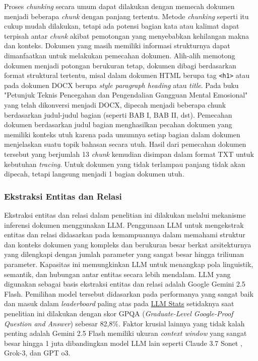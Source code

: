 Proses \textit{chunking} secara umum dapat dilakukan dengan memecah dokumen menjadi beberapa \textit{chunk} dengan panjang tertentu.
Metode \textit{chunking} seperti itu cukup mudah dilakukan, tetapi ada potensi bagian kata atau kalimat dapat terpisah antar \textit{chunk} akibat pemotongan yang menyebabkan kehilangan makna dan konteks.
Dokumen yang masih memiliki informasi strukturnya dapat dimanfaatkan untuk melakukan pemecahan dokumen.
Alih-alih memotong dokumen menjadi potongan berukuran tetap, dokumen dibagi berdasarkan format struktural tertentu, misal dalam dokumen HTML berupa tag \texttt{<h1>} atau pada dokumen DOCX berupa \textit{style paragraph heading} atau \textit{title}.
Pada buku "Petunjuk Teknis Pencegahan dan Pengendalian Gangguan Mental Emosional" yang telah dikonversi menjadi DOCX, dipecah menjadi beberapa chunk berdasarkan judul-judul bagian (seperti BAB I, BAB II, dst).
Pemecahan dokumen berdasarkan judul bagian menghasilkan pecahan dokumen yang memiliki konteks utuh karena pada umumnya setiap bagian dalam dokumen menjelaskan suatu topik bahasan secara utuh.
Hasil dari pemecahan dokumen tersebut yang berjumlah 13 \textit{chunk} kemudian disimpan dalam format TXT untuk kebutuhan \textit{tracing}.
Untuk dokumen yang tidak terlampau panjang tidak akan dipecah, tetapi langsung menjadi 1 bagian dokumen utuh.

\subsubsection{Ekstraksi Entitas dan Relasi}
Ekstraksi entitas dan relasi dalam penelitian ini dilakukan melalui mekanisme inferensi dokumen menggunakan LLM.
Penggunaan LLM untuk mengekstrak entitas dan relasi didasarkan pada kemampuannya dalam memahami struktur dan konteks dokumen yang kompleks dan berukuran besar berkat arsitekturnya yang dilengkapi dengan jumlah parameter yang sangat besar hingga triliunan parameter.
Kapasitas ini memungkinkan LLM untuk menangkap pola linguistik, semantik, dan hubungan antar entitas secara lebih mendalam.
LLM yang digunakan sebagai basis ekstraksi entitas dan relasi adalah Google Gemini 2.5 Flash.
Pemilihan model tersebut didasarkan pada performanya yang sangat baik dan masuk dalam \textit{leaderboard} paling atas pada \href{https://llm-stats.com/}{LLM Stats} setidaknya saat penelitian ini dilakukan dengan skor GPQA (\textit{Graduate-Level Google-Proof Question and Answer}) sebesar 82,8\%.
Faktor krusial lainnya yang tidak kalah penting adalah Gemini 2.5 Flash memiliki ukuran \textit{context window} yang sangat besar hingga 1 juta dibandingkan model LLM lain seperti Claude 3.7 Sonet , Grok-3, dan GPT o3.

